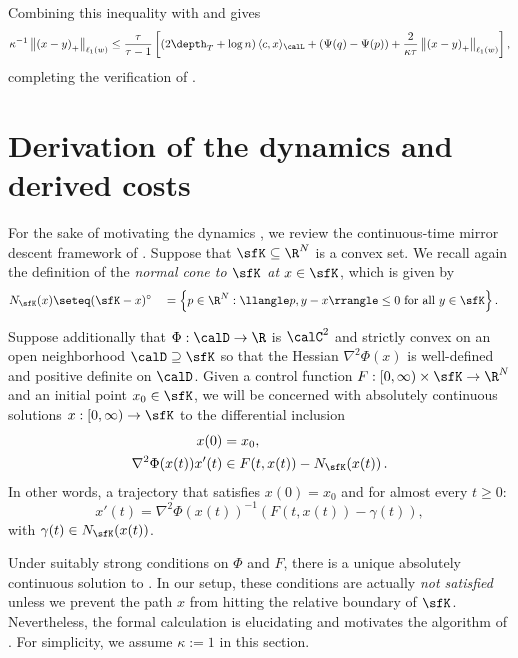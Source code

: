 Combining this inequality with  and  gives
\begin{equation}\label{eq:mvmt3}
\kappa^{-1} \left\|\left(x-y\right)_+\right\|_{\ell_1(w)} 
\leq \frac{\tau}{\tau-1}\left[
\left(2\depth_T + \log n\right) \langle c,x\rangle_{\calL} + \left(\Psi(q)-\Psi(p)\right) 
+ \frac{2}{\kappa\tau} \left\|\left(x-y\right)_+\right\|_{\ell_1(w)}\right],
\end{equation}
completing the verification of .



\section{Derivation of the dynamics and derived costs}
\label{sec:derivation}


For the sake of motivating the dynamics , we review the
continuous-time mirror descent framework of \cite{BCLLM18}.
Suppose that $\sfK \subseteq \R^N$ is a convex set.
We recall again the definition of the \emph{normal cone to 
	$\sfK$ at $x \in \sfK$}, which is given by
\begin{alignat*}{3}
N_{\sfK}(x) &\seteq (\sfK-x)^{\circ} &&= \left\{ p \in \R^N : \llangle p,y-x\rrangle \leq 0 \textrm{ for all } y \in \sfK\right\}.
\end{alignat*}

Suppose additionally that $\Phi : \calD \to \R$
is $\calC^2$ and strictly convex on an open neighborhood $\calD \supseteq \sfK$ so that
the Hessian $\nabla^2 \Phi(x)$ is well-defined and positive definite on $\calD$.
Given a control function $F : [0,\infty) \times \sfK \to \R^N$ and an initial point $x_0 \in \sfK$, we will be concerned
with absolutely continuous solutions $x : [0,\infty) \to \sfK$ to the differential inclusion
\begin{align*}
x(0) &= x_0, \\
\nabla^2 \Phi(x(t)) x'(t) &\in F(t,x(t)) - N_{\sfK}(x(t))\,.
\end{align*}
In other words, a trajectory that satisfies $x(0) = x_0$ and
for almost every $t \geq 0$:
\begin{equation}\label{eq:mirror}
x'(t) = \nabla^2 \Phi(x(t))^{-1} \left(F(t,x(t)) - \gamma(t)\right),
\end{equation}
with $\gamma(t) \in N_{\sfK}(x(t))$.

Under suitably strong conditions on $\Phi$ and $F$, there is a unique absolutely continuous
solution to  \cite{BCLLM18}.
In our setup, these conditions are actually \emph{not satisfied} unless we prevent the path $x$ from hitting the relative boundary of $\sfK$.
Nevertheless, the formal calculation is elucidating and motivates the algorithm of . For simplicity, we assume $\kappa:=1$ in this section.

